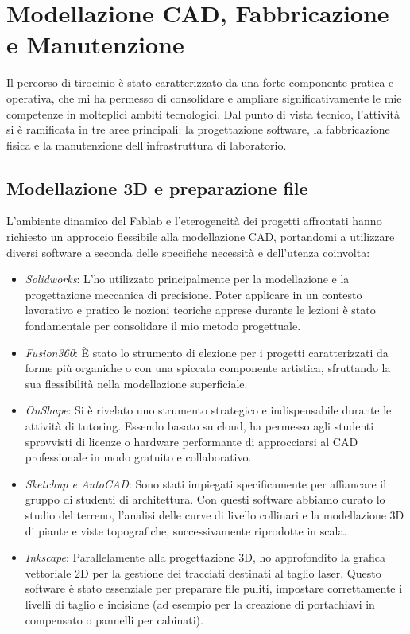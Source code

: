 \section{Modellazione CAD, Fabbricazione e Manutenzione}
%
Il percorso di tirocinio è stato caratterizzato da una forte componente pratica e operativa, che mi ha permesso di consolidare e ampliare significativamente le mie competenze in molteplici ambiti tecnologici. Dal punto di vista tecnico, l'attività si è ramificata in tre aree principali: la progettazione software, la fabbricazione fisica e la manutenzione dell'infrastruttura di laboratorio.

%
\subsection{Modellazione 3D e preparazione file}
L'ambiente dinamico del Fablab e l'eterogeneità dei progetti affrontati hanno richiesto un approccio flessibile alla modellazione CAD, portandomi a utilizzare diversi software a seconda delle specifiche necessità e dell'utenza coinvolta:

\begin{itemize}
    \item \emph{Solidworks}: L'ho utilizzato principalmente per la modellazione e la progettazione meccanica di precisione. Poter applicare in un contesto lavorativo e pratico le nozioni teoriche apprese durante le lezioni è stato fondamentale per consolidare il mio metodo progettuale.
    \item \emph{Fusion360}: È stato lo strumento di elezione per i progetti caratterizzati da forme più organiche o con una spiccata componente artistica, sfruttando la sua flessibilità nella modellazione superficiale.
    \item \emph{OnShape}: Si è rivelato uno strumento strategico e indispensabile durante le attività di tutoring. Essendo basato su cloud, ha permesso agli studenti sprovvisti di licenze o hardware performante di approcciarsi al CAD professionale in modo gratuito e collaborativo.
    \item \emph{Sketchup e AutoCAD}: Sono stati impiegati specificamente per affiancare il gruppo di studenti di architettura. Con questi software abbiamo curato lo studio del terreno, l'analisi delle curve di livello collinari e la modellazione 3D di piante e viste topografiche, successivamente riprodotte in scala.
    \item \emph{Inkscape}: Parallelamente alla progettazione 3D, ho approfondito la grafica vettoriale 2D per la gestione dei tracciati destinati al taglio laser. Questo software è stato essenziale per preparare file puliti, impostare correttamente i livelli di taglio e incisione (ad esempio per la creazione di portachiavi in compensato o pannelli per cabinati).
\end{itemize}

